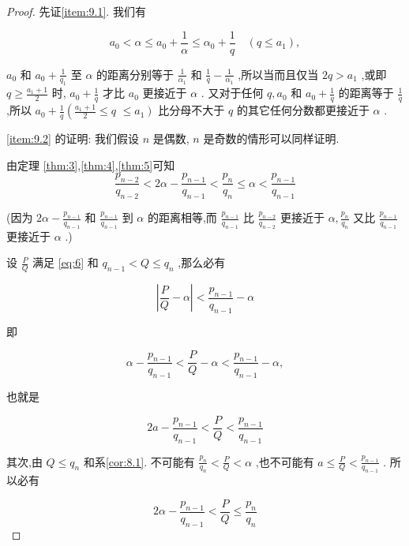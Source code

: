 \documentclass{ctexart}
\begin{document}
\begin{proof}
  先证\ref{item:9.1}. 我们有

\[
{a}_{0} < \alpha \leq {a}_{0} + \frac{1}{\alpha} \leq {\alpha}_{0} + \frac{1}{q}\quad\left( {q \leq {a}_{1}}\right) ,
\]

\({a}_{0}\) 和 \({a}_{0} + \frac{1}{{q}_{1}}\) 至 \(\alpha\) 的距离分别等于 \(\frac{1}{{\alpha }_{1}}\) 和 \(\frac{1}{q} - \frac{1}{{\alpha }_{1}}\) ,所以当而且仅当 \({2q} > {a}_{1}\) ,或即 \(q \geq \frac{{a}_{1} + 1}{2}\) 时, \({a}_{0} + \frac{1}{q}\) 才比 \({a}_{0}\) 更接近于 \(\alpha\) . 又对于任何 \(q,{a}_{0}\) 和 \({a}_{0} + \frac{1}{q}\) 的距离等于 \(\frac{1}{q}\) ,所以 \({a}_{0} + \frac{1}{q}\left( {\frac{{a}_{1} + 1}{2} \leq q}\right.\) \(\left. { \leq {a}_{1}}\right)\) 比分母不大于 \(q\) 的其它任何分数都更接近于 \(\alpha\) .

\ref{item:9.2} 的证明: 我们假设 \(n\) 是偶数, \(n\) 是奇数的情形可以同样证明.

由定理 \ref{thm:3},\ref{thm:4},\ref{thm:5}可知
\begin{equation}
\label{eq:8}
\frac{{p}_{n - 2}}{{q}_{n - 2}} < {2\alpha } - \frac{{p}_{n - 1}}{{q}_{n - 1}} < \frac{{p}_{n}}{{q}_{n}} \leq \alpha < \frac{{p}_{n - 1}}{{q}_{n - 1}}
\end{equation}

(因为 \({2\alpha } - \frac{{p}_{n - 1}}{{q}_{n - 1}}\) 和 \(\frac{{p}_{n - 1}}{{q}_{n - 1}}\) 到 \(\alpha\) 的距离相等,而 \(\frac{{p}_{n - 1}}{{q}_{n - 1}}\) 比 \(\frac{{p}_{n - 2}}{{q}_{n - 2}}\) 更接近于 \(\alpha ,\frac{{p}_{n}}{{q}_{n}}\) 又比 \(\frac{{p}_{n - 1}}{{q}_{n - 1}}\) 更接近于 \(\alpha\) .)

设 \(\frac{P}{Q}\) 满足 \eqref{eq:6} 和 \({q}_{n - 1} < Q \leq {q}_{n}\) ,那么必有

\[
\left| {\frac{P}{Q} - \alpha}\right| < \frac{{p}_{n - 1}}{{q}_{n - 1}} - \alpha
\]

即

\[
\alpha - \frac{{p}_{n - 1}}{{q}_{n - 1}} < \frac{P}{Q} - \alpha < \frac{{p}_{n - 1}}{{q}_{n - 1}} - \alpha ,
\]

也就是

\[
{2a} - \frac{{p}_{n - 1}}{{q}_{n - 1}} < \frac{P}{Q} < \frac{{p}_{n - 1}}{{q}_{n - 1}}
\]

其次,由 \(Q \leq {q}_{n}\) 和系\ref{cor:8.1}. 不可能有 \(\frac{{p}_{n}}{{q}_{n}} < \frac{P}{Q} < \alpha\) ,也不可能有 \(a \leq \frac{P}{Q} < \frac{{p}_{n - 1}}{{q}_{n - 1}}\) . 所以必有

\begin{equation}
\label{eq:9}
{2\alpha } - \frac{{p}_{n - 1}}{{q}_{n - 1}} < \frac{P}{Q} \leq \frac{{p}_{n}}{{q}_{n}}
\end{equation}


\end{proof}
\end{document}
